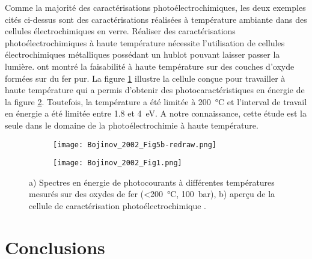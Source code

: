 \begin{refsection}
    Comme la majorité des caractérisations photoélectrochimiques, les deux exemples cités ci-dessus sont des
    caractérisations réalisées à température ambiante dans des cellules électrochimiques en verre.
    Réaliser des caractérisations photoélectrochimiques à haute température nécessite l'utilisation de cellules
    électrochimiques métalliques possédant un hublot pouvant laisser passer la lumière.
    \citet{Bojinov2002} ont montré la faisabilité à haute température sur des couches d'oxyde formées sur du
    fer pur. La figure \ref{subfig:Bojinov_HT_cell} illustre la cellule conçue pour travailler à
    haute température qui a permis d'obtenir des photocaractéristiques en énergie de la figure
    \ref{subfig:Bojinov_PEC_result}. Toutefois, la température a été limitée à \SI{200}{\degreeCelsius} et l'interval
    de travail en énergie a été limitée entre 1.8 et \SI{4}{\electronvolt}. A notre connaissance, cette étude est la
    seule dans le domaine de la photoélectrochimie à haute température.

	\begin{figure}[H] 
 		\centering 
            \begin{subfigure}[b]{0.55\textwidth}
                \texttt{[image: Bojinov\_2002\_Fig5b-redraw.png]} 
                \caption{}
                \label{subfig:Bojinov_HT_cell}
            \end{subfigure}
            \quad
            \begin{subfigure}[b]{0.55\textwidth} 
                \texttt{[image: Bojinov\_2002\_Fig1.png]} 
                \caption{}
                \label{subfig:Bojinov_PEC_result} 
           \end{subfigure}
       \caption[a) Spectres en énergie de photocourants à différentes températures mesurés sur des oxydes de fer
           (\SI{<200}{\degreeCelsius}, \SI{100}{\bar}),
                b) aperçu de la cellule de caractérisation photoélectrochimique.]
       {a) Spectres en énergie de photocourants à différentes températures mesurés sur des oxydes de fer
           (\SI{<200}{\degreeCelsius}, \SI{100}{\bar}),
       b) aperçu de la cellule de caractérisation photoélectrochimique \citep{Bojinov2002}.}
      \label{fig:HT_PEC_bojinov}
 	\end{figure}

\section{Conclusions}\label{sec:impacting_parameters}


\end{refsection}
